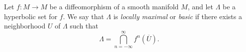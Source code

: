 \documentclass[12pt]{article}
\begin{document}
Let $f:M\to M$ be a diffeomorphism of a smooth manifold $M$, and let $\Lambda$ be a hyperbolic set for $f$. We say that $\Lambda$ is \emph{locally maximal} or \emph{basic} if there exists a neighborhood $U$ of $\Lambda$ such that
$$\Lambda=\bigcap_{n=-\infty}^\infty f^n(\overline{U}).$$
\end{document}

